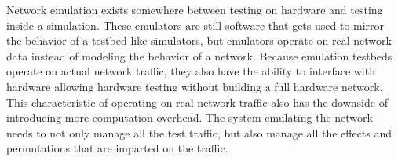 Network emulation exists somewhere between testing on hardware and testing inside a simulation.
These emulators are still software that gets used to mirror the behavior of a testbed like simulators, but emulators operate on real network data instead of modeling the behavior of a network.
Because emulation testbeds operate on actual network traffic, they also have the ability to interface with hardware allowing hardware testing without building a full hardware network.
This characteristic of operating on real network traffic also has the downside of introducing more computation overhead.
The system emulating the network needs to not only manage all the test traffic, but also manage all the effects and permutations that are imparted on the traffic.\par

